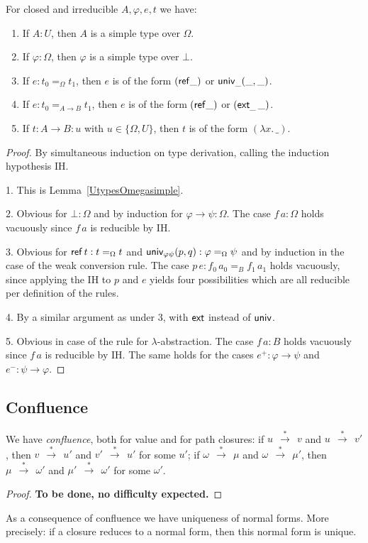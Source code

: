 \documentclass[10pt,a4paper]{article}
\newcommand{\lam}[2]{\lambda{#1.\,#2}}
\newcommand{\set}[1]{\{#1\}}
\newcommand{\unphsi}{{\univ_{\varphi\psi}}}
\newcommand{\rtr}{~~{\stackrel{*}{\to}}~~}
\newcommand{\Ref}{{\sf ref}}
\newcommand{\ext}{{\sf ext}}
\newcommand{\univ}{{\sf univ}}
\begin{document}
\begin{lemma}[Canonicity]\label{lem:canonicity}
For closed and irreducible $A,\varphi,e,t$ we have:
\begin{enumerate}
\item If $A:U$, then $A$ is a simple type over $\Omega$.
\item If $\varphi:\Omega$, then $\varphi$ is a simple type over $\bot$.
\item If $e:t_0 =_\Omega t_1$, then $e$ is of the form $(\Ref\_)$ or $\univ_\_(\_,\_)$.
\item If $e:t_0 =_{A{\to}B} t_1$, then $e$ is of the form $(\Ref\_)$ or $(\ext_\_\,\_)$.
\item If $t:{A\to B}:u$ with $u\in\set{\Omega,U}$, then $t$ is of the form $(\lam{x}{\_})$.
\end{enumerate}
\end{lemma}
\begin{proof} By simultaneous induction on type derivation,
calling the induction hypothesis IH.

1. This is Lemma~\ref{UtypesOmegasimple}.

2. Obvious for $\bot:\Omega$ and by induction for $\varphi\to\psi:\Omega$.
The case $f\,a :\Omega$ holds vacuously since $f\,a$ is reducible by IH.

3. Obvious for $\Ref\,t : t =_\Omega t$ and $\unphsi(p,q): \varphi =_\Omega \psi$
and by induction in the case of the weak conversion rule.
The case $p\,e: f_0\,a_0 =_B f_1\,a_1$ holds vacuously, since applying the IH to 
$p$ and $e$ yields four possibilities which are all reducible per definition
of the rules.

4. By a similar argument as under 3, with $\ext$ instead of $\univ$.

5. Obvious in case of the rule for $\lambda$-abstraction. 
The case $f\,a :B$ holds vacuously since $f\,a$ is reducible by IH.
The same holds for the cases $e^+ : \varphi\to\psi$ and $e^- : \psi\to\varphi$.
\end{proof}

\subsection{Confluence}\label{sec:confluence}

\begin{theorem}\label{confluence}
We have \emph{confluence}, both for value and for path closures:
if $u\rtr v$ and $u\rtr v'$, then $v\rtr u'$ and $v'\rtr u'$ for some $u'$;\quad
if $\omega\rtr \mu$ and $\omega\rtr \mu'$, 
then $\mu\rtr \omega'$ and $\mu'\rtr \omega'$ for some $\omega'$.
\end{theorem}
\begin{proof}{\bf To be done, no difficulty expected.}\end{proof}
As a consequence of confluence we have uniqueness of normal forms.
More precisely: if a closure reduces to a normal form, then this normal
form is unique.
\end{document}
